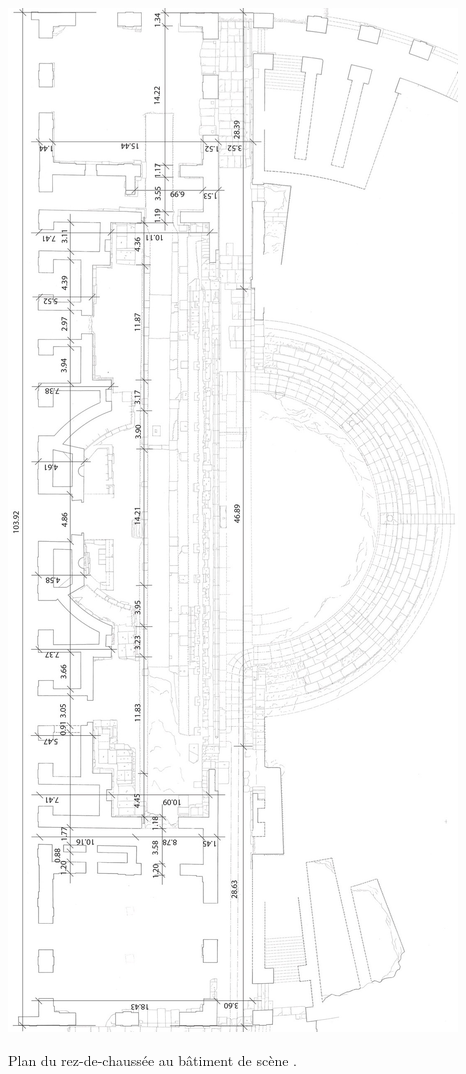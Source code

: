 \begin{figureth}
	\includegraphics[height=0.8\paperheight]{images/cotes}
	\caption[Plan du rez-de-chaussée au bâtiment de scène.]{Plan du rez-de-chaussée au bâtiment de scène \cite[Pl. XXI]{orangePl}.}
	\label{cotes} 
\end{figureth}

